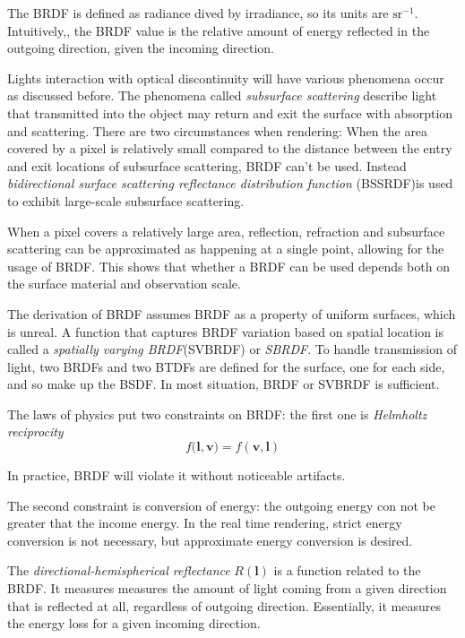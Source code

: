 \documentclass[10pt, a4paper]{article}
\begin{document}
            The BRDF is defined as radiance dived by irradiance, so its units are $\text{sr}^{-1}$. Intuitively,, the BRDF value is the relative amount of energy reflected in the outgoing direction, given the incoming direction. 

            Lights interaction with optical discontinuity will have various phenomena occur as discussed before. The phenomena called \emph{subsurface scattering} describe light that transmitted into the object may return and exit the surface with absorption and scattering. There are two circumstances when rendering: When the area covered by a pixel is relatively small compared to the distance between the entry and exit locations of subsurface scattering, BRDF can't be used. Instead \emph{bidirectional surface scattering reflectance distribution function} (BSSRDF)is used to exhibit large-scale subsurface scattering. 

            When a pixel covers a relatively large area, reflection, refraction and subsurface scattering can be approximated as happening at a single point, allowing for the usage of BRDF. This shows that whether a BRDF can be used depends both on the surface material and observation scale. 

            The derivation of BRDF assumes BRDF as a property of uniform surfaces, which is unreal. A function that captures BRDF variation based on spatial location is called a \emph{spatially varying BRDF}(SVBRDF) or \emph{SBRDF}. To handle transmission of light, two BRDFs and two BTDFs are defined for the surface, one for each side, and so make up the BSDF. In most situation, BRDF or SVBRDF is sufficient. \newline


            The laws of physics put two constraints on BRDF: the first one is \emph{Helmholtz reciprocity}
                $$f(\textbf{l}, \textbf{v)} = f(\textbf{v}, \textbf{l})$$

            In practice, BRDF will violate it without noticeable artifacts. 

            The second constraint is conversion of energy: the outgoing energy con not be greater that the income energy. In the real time rendering, strict energy conversion is not necessary, but approximate energy conversion is desired. 

            The \emph{directional-hemispherical reflectance} $R(\textbf{l})$ is a function related to the BRDF. It measures measures the amount of light coming from a given direction that is reflected at all, regardless of outgoing direction. Essentially, it measures the energy loss for a given incoming direction. 
\end{document}

